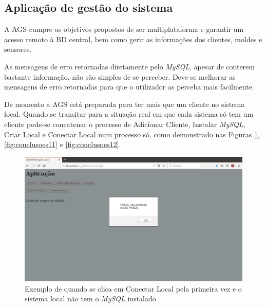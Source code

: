 \documentclass[11pt,twoside,a4paper]{report}
\begin{document}
\subsection{Aplicação de gestão do sistema}
A AGS cumpre os objetivos propostos de ser multiplataforma e garantir um acesso remoto à BD central, bem como gerir as informações dos clientes, moldes e sensores.\par
As mensagens de erro retornadas diretamente pelo \textit{MySQL}, apesar de conterem bastante informação, não são simples de se perceber. Deve-se melhorar as mensagens de erro retornadas para que o utilizador as perceba mais facilmente.\par 
De momento a AGS está preparada para ter mais que um cliente no sistema local. Quando se transitar para a situação real em que cada sistema só tem um cliente pode-se concatenar o processo de Adicionar Cliente, Instalar \textit{MySQL}, Criar Local e Conectar Local num processo só, como demonstrado nas Figuras \ref{fig:conclusoes1}, \ref{fig:conclusoes11} e \ref{fig:conclusoes12}.
\begin{figure}[H]
	\begin{center}
		\includegraphics[trim={0 10.5cm 0 0},clip,width=1\textwidth]{futuro03} %
		\caption[Exemplo de quando se clica em Conectar Local pela primeira vez]{Exemplo de quando se clica em Conectar Local pela primeira vez e o sistema local não tem o \textit{MySQL} instalado}
		\label{fig:conclusoes1}
	\end{center}
\end{figure}
\end{document}
